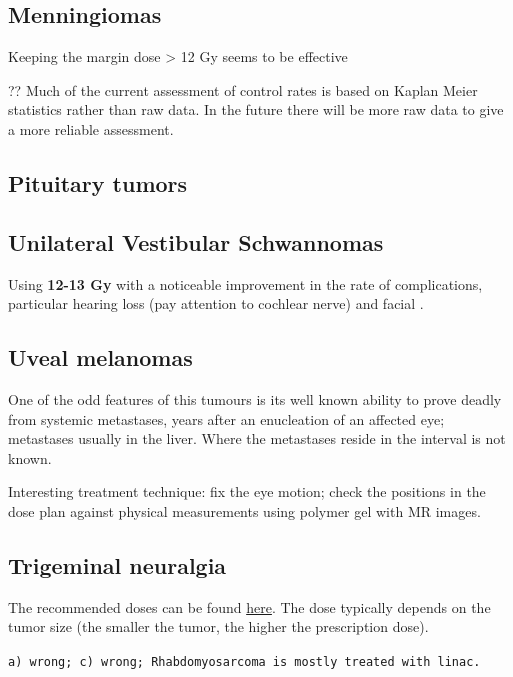 \documentclass[]{book}
\theoremstyle{definition}
\theoremstyle{definition}
\theoremstyle{definition}
\theoremstyle{remark}
\begin{document}
\subsection{Menningiomas}\label{menningiomas}

Keeping the margin dose \textgreater{} 12 Gy seems to be effective

?? Much of the current assessment of control rates is based on Kaplan
Meier statistics rather than raw data. In the future there will be more
raw data to give a more reliable assessment.

\subsection{Pituitary tumors}\label{pituitary-tumors}

\subsection{Unilateral Vestibular
Schwannomas}\label{unilateral-vestibular-schwannomas}

Using \textbf{12-13 Gy} with a noticeable improvement in the rate of
complications, particular hearing loss (pay attention to cochlear nerve)
and facial .

\subsection{Uveal melanomas}\label{uveal-melanomas}

One of the odd features of this tumours is its well known ability to
prove deadly from systemic metastases, years after an enucleation of an
affected eye; metastases usually in the liver. Where the metastases
reside in the interval is not known.

Interesting treatment technique: fix the eye motion; check the positions
in the dose plan against physical measurements using polymer gel with MR
images.

\subsection{Trigeminal neuralgia}\label{trigeminal-neuralgia}

The recommended doses can be found
\href{http://www.aboutcancer.com/gk_doses.htm}{here}. The dose typically
depends on the tumor size (the smaller the tumor, the higher the
prescription dose).

\texttt{a)\ wrong;\ c)\ wrong;\ Rhabdomyosarcoma\ is\ mostly\ treated\ with\ linac.}
\end{document}
